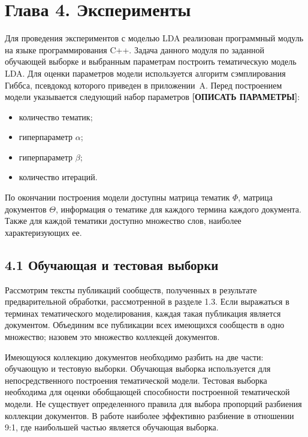 \documentclass[a4paper]{report}
\begin{document}
	
	\section{Глава 4. Эксперименты}
	
	Для проведения экспериментов с моделью LDA реализован программный модуль на языке программирования C++. Задача данного модуля по заданной обучающей выборке и выбранным параметрам построить тематическую модель LDA. Для оценки параметров модели используется алгоритм сэмплирования Гиббса, псевдокод которого приведен в приложении~A. 
	Перед построением модели указывается следующий набор параметров \textbf{[ОПИСАТЬ ПАРАМЕТРЫ]}:
	\begin{itemize}
		\item{количество тематик;     }
		\item{гиперпараметр $\alpha$; }
		\item{гиперпараметр $\beta$;  }
		\item{количество итераций.	  }
	\end{itemize}
	
	По окончании построения модели доступны матрица тематик $\Phi$, матрица документов $\Theta$, информация о тематике для каждого термина каждого документа. Также для каждой тематики доступно множество слов, наиболее характеризующих ее.
	
	\subsection{4.1 Обучающая и тестовая выборки}
	
	Рассмотрим тексты публикаций сообществ, полученных в результате предварительной обработки, рассмотренной в разделе 1.3. Если выражаться в терминах тематического моделирования, каждая такая публикация является документом. Объединим все публикации всех имеющихся сообществ в одно множество; назовем это множество коллекцей документов.
	
	Имеющуюся коллекцию документов необходимо разбить на две части: обучающую и тестовую выборки.
	Обучающая выборка используется для непосредственного построения тематической модели. Тестовая выборка необходима для оценки обобщающей способности построенной тематической модели. Не существует определенного правила для выбора пропорций разбиения коллекции документов. В работе \cite{bib:Voron1} наиболее эффективно разбиение в отношении 9:1, где наибольшей частью является обучающая выборка.
	
\end{document}
